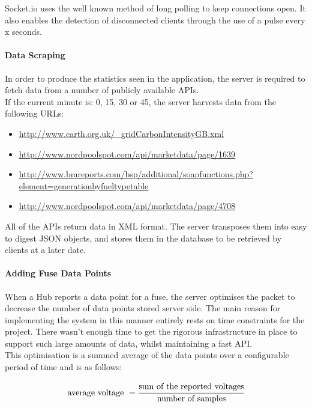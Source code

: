 \documentclass[draft,preprint,12pt,3p]{elsarticle}
\begin{document}
Socket.io uses the well known method of long polling to keep connections open. It also enables the detection of disconnected clients through the use of a pulse every x seconds.

\paragraph{Data Scraping}

In order to produce the statistics seen in the application, the server is required to fetch data from a number of publicly available APIs.\\
If the current minute is: 0, 15, 30 or  45, the server harvests data from the following URLs:
\begin{itemize}
\item \url{http://www.earth.org.uk/_gridCarbonIntensityGB.xml}

\item \url{http://www.nordpoolspot.com/api/marketdata/page/1639}

\item \url{http://www.bmreports.com/bsp/additional/soapfunctions.php?element=generationbyfueltypetable}

\item \url{http://www.nordpoolspot.com/api/marketdata/page/4708}
\end{itemize}
All of the APIs return data in XML format. The server transposes them into easy to digest JSON objects, and stores them in the database to be retrieved by clients at a later date.\\

\paragraph{Adding Fuse Data Points}
When a Hub reports a data point for a fuse, the server optimises the packet to decrease the number of data points stored server side. The main reason for implementing the system in this manner entirely rests on time constraints for the project. There wasn't enough time to get the rigorous infrastructure in place to support such large amounts of data, whilst maintaining a fast API.\\
This optimisation is a summed average of the data points over a configurable period of time and is as follows:

\begin{equation*} 
\text{average voltage } = \cfrac{\text{sum of the reported voltages}}{\text{number of samples}}
\end{equation*}
\end{document}
